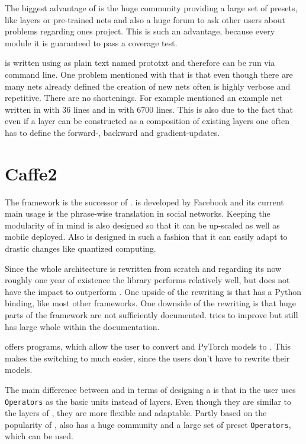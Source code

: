 The biggest advantage of \caffe is the huge community providing a large set of presets, like layers or pre-trained nets and also a huge forum to ask other users about problems regarding ones project. This is such an advantage, because every module it is  guaranteed to pass a coverage test. \cite{jia2014caffe}

\caffe is written using as plain text named prototxt and therefore can be run via command line. One problem mentioned with that is that even though there are many nets already defined the creation of new nets often is highly verbose and repetitive. There are no shortenings. For example \cite{tim2018CNNArchLang} mentioned an example net written in \cnnarch with 36 lines and in \caffe with 6700 lines. This is also due to the fact that even if a layer can be constructed as a composition of existing layers one often has to define the forward-, backward and gradient-updates. %

\section{Caffe2} \label{sec: Caffe2}
The framework \caffetwo is the successor of \caffe. \caffetwo is developed by Facebook and its current main usage is the phrase-wise translation in social networks. Keeping the modularity of \caffe in mind \caffetwo is also designed so that it can be up-scaled as well as mobile deployed. Also \caffetwo is designed in such a fashion that it can easily adapt to drastic changes like quantized computing. \cite{Caffe2Homepage}

Since the whole architecture is rewritten from scratch and regarding its now roughly one year of existence the library performs relatively well, but does not have the impact to outperform \caffe \cite{heise:Caffe2}.
One upside of the rewriting is that \caffetwo has a Python binding, like most other frameworks. One downside of the rewriting is that huge parts of the framework are not sufficiently documented. \caffetwo tries to improve but still has large whole within the documentation. \cite{tim2018CNNArchLang}

\caffetwo offers programs, which allow the user to convert \caffe and PyTorch models to \caffetwo. This makes the switching to \caffetwo much easier, since the users don't have to rewrite their models. \cite{Caffe2Homepage}

The main difference between \caffe and \caffetwo in terms of designing a \nn is that in \caffetwo the user uses \texttt{Operators} as the basic units instead of layers. Even though they are similar to the layers of \caffe, they are more flexible and adaptable. Partly based on the popularity of \caffe, \caffetwo also has a huge community and a large set of preset \texttt{Operators}, which can be used. \cite{Caffe2Homepage}

